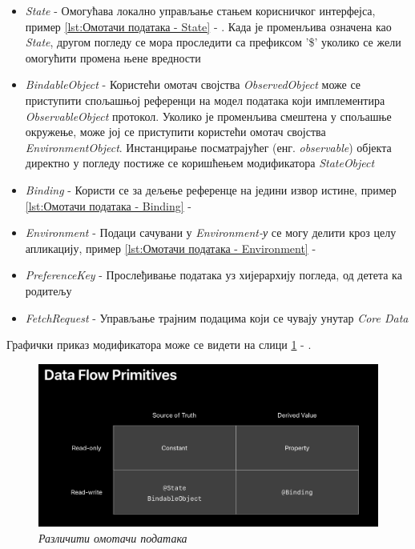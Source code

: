 \documentclass[12pt,oneside]{memoir}
\begin{document}
\begin{itemize}
    \item \textit{State} - Омогућава локално управљање стањем корисничког интерфејса, пример \ref{lst:Омотачи података - State} - . Када је променљива означена као \textit{State}, другом погледу се мора проследити са префиксом '\$' уколико се жели омогућити промена њене вредности
    \item \textit{BindableObject} - Користећи омотач својства \textit{ObservedObject}  може се приступити спољашњој референци на модел података који имплементира \textit{ObservableObject} протокол. Уколико је променљива смештена у спољашње окружење, може јој се приступити користећи омотач својства \textit{EnvironmentObject}. Инстанцирање посматрајућег (енг. \textit{observable}) објекта директно у погледу постиже се коришћењем модификатора \textit{StateObject}
    \item \textit{Binding} - Користи се за дељење референце на једини извор истине, пример \ref{lst:Омотачи података - Binding} - 
    \item \textit{Environment} - Подаци сачувани у \textit{Environment-у} се могу делити кроз целу апликацију, пример \ref{lst:Омотачи података - Environment} - 
    \item \textit{PreferenceKey} - Прослеђивање података уз хијерархију погледа, од детета ка родитељу
    \item \textit{FetchRequest} - Управљање трајним подацима који се чувају унутар \textit{Core Data}
\end{itemize}

Графички приказ модификатора може се видети на слици \ref{slika:data_flow_primitives} - .

\begin{figure}[H]
\includegraphics[width=1\textwidth]{images/DataFlowPrimitives.png}
\centering
\caption{\textit{Различити омотачи података}}
\label{slika:data_flow_primitives}
\end{figure}
\end{document}
